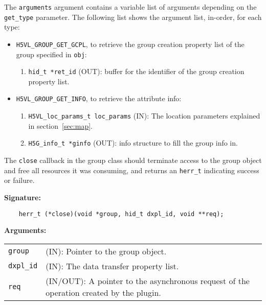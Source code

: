 The {\tt arguments} argument contains a variable list of arguments
depending on the {\tt get\_type} parameter. The following list shows
the argument list, in-order, for each type:

\begin{itemize}
\item {\tt H5VL\_GROUP\_GET\_GCPL}, to retrieve the group creation
  property list of the group specified in {\tt obj}:
  \begin{enumerate}
  \item {\tt hid\_t *ret\_id} (OUT): buffer for the identifier of the
    group creation property list.
  \end{enumerate}

\item {\tt H5VL\_GROUP\_GET\_INFO}, to retrieve the attribute info:
  \begin{enumerate}
  \item {\tt H5VL\_loc\_params\_t loc\_params} (IN): The location parameters
    explained in section~\ref{sec:map}. 
  \item {\tt H5G\_info\_t *ginfo} (OUT): info structure to fill the
    group info in.
  \end{enumerate}
\end{itemize}

The {\tt close} callback in the group class should terminate access to
the group object and free all resources it was consuming, and returns
an {\tt herr\_t} indicating success or failure.

\textbf{Signature:}
\begin{lstlisting}
    herr_t (*close)(void *group, hid_t dxpl_id, void **req);
\end{lstlisting}

\textbf{Arguments:}\\
\begin{tabular}{l p{10cm}}
  {\tt group} & (IN): Pointer to the group object.\\
  {\tt dxpl\_id} & (IN): The data transfer property list.\\
  {\tt req} & (IN/OUT): A pointer to the asynchronous request of the
  operation created by the plugin.\\
\end{tabular}

